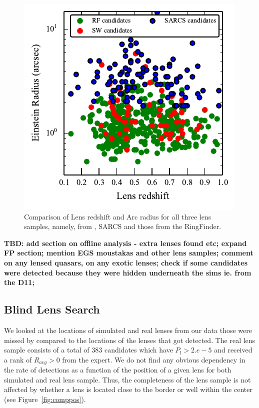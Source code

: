 \documentclass[useAMS,usenatbib,a4paper]{mn2e}
\begin{document}
\begin{figure}
\begin{center}
\includegraphics[scale=1.0]{sw-cfhtls-figs/zlens_reinst.pdf}
\caption{ \label{fig:zlre}
Comparison of Lens redshift and Arc radius for all three lens samples,
namely, from \sw, SARCS and those from the RingFinder.}
\end{center}
\end{figure}

{\bf TBD: 
add section on offline analysis - extra lenses found etc;  
expand FP section;  
mention EGS moustakas and other lens samples; 
comment on any lensed quasars, on any exotic lenses;
check if some candidates were detected because they were hidden
underneath the sims ie. from the D11;

}
\subsection{Blind Lens Search}
We looked at the locations of simulated and real lenses from our data
those were missed by \sw compared to the locations of the lenses that
got detected. The real lens sample consists of a total of 383 candidates
which have $P_l>2.e-5$ and received a rank of $R_{avg}>0$ from the
expert. We do not find any obvious dependency in the rate of detections
as a function of the position of a given lens for both simulated and
real lens sample. Thus, the completeness of the lens sample is not
affected by whether a lens is located close to the border or well within
the center (see  Figure~\ref{fig:comppos}).
\end{document}
